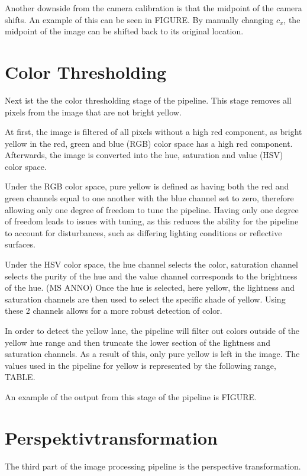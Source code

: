 \documentclass[arbeit=studie,oneside,BCOR=12mm]{ArbeitRST}
\begin{document}
Another downside from the camera calibration is that the midpoint of the camera
shifts. An example of this can be seen in FIGURE. By manually
changing $c_x$, the midpoint of the image can be shifted back to its 
original location.

\section{\glqq Color Thresholding\grqq}

Next ist the the color thresholding stage of the pipeline. This stage removes
all pixels from the image that are not bright yellow.

At first, the image is filtered of all pixels without a high red component, as
bright yellow in the red, green and blue (RGB) color space has a high red
component. Afterwards, the image is converted into the hue, saturation and
value (HSV) color space. 

Under the RGB color space, pure yellow is defined as having both the red and
green channels equal to one another with the blue channel set to zero,
therefore allowing only one degree of freedom to tune the pipeline.  Having
only one degree of freedom leads to issues with tuning, as this reduces the
ability for the pipeline to account for disturbances, such as differing
lighting conditions or reflective surfaces.

Under the HSV color space, the hue channel selects the color, saturation
channel selects the purity of the hue and the value channel corresponds to the
brightness of the hue. (MS ANNO) Once the hue is selected, here yellow, the
lightness and saturation channels are then used to select the specific shade of
yellow. Using these 2 channels allows for a more robust detection of color.

In order to detect the yellow lane, the pipeline will filter out colors outside
of the yellow hue range and then truncate the lower section of the lightness
and saturation channels. As a result of this, only pure yellow is left in the
image. The values used in the pipeline for yellow is represented by the
following range, TABLE.

An example of the output from this stage of the pipeline is FIGURE.

\section{Perspektivtransformation}

The third part of the image processing pipeline is the perspective 
transformation. 
\end{document}
